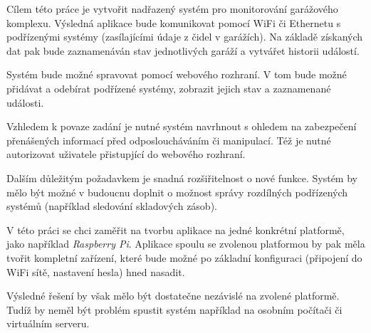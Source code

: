 Cílem této práce je vytvořit nadřazený systém pro monitorování garážového komplexu. Výsledná aplikace bude komunikovat pomocí WiFi či Ethernetu s podřízenými systémy (zasílajícími údaje z čidel v garážích). Na základě získaných dat pak bude zaznamenáván stav jednotlivých garáží a vytvářet historii událostí.

Systém bude možné spravovat pomocí webového rozhraní. V tom bude možné přidávat a odebírat podřízené systémy, zobrazit jejich stav a zaznamenané události.

Vzhledem k povaze zadání je nutné systém navrhnout s ohledem na zabezpečení přenášených informací před odposloucháváním či manipulací. Též je nutné autorizovat uživatele přistupjící do webového rozhraní.

Dalším důležitým požadavkem je snadná rozšiřitelnost o nové funkce. Systém by mělo být možné v budoucnu doplnit o možnost správy rozdílných podřízených systémů (například sledování skladových zásob).

V této práci se chci zaměřit na tvorbu aplikace na jedné konkrétní platformě, jako například \textit{Raspberry Pi}. Aplikace spoulu se zvolenou platformou by pak měla tvořit kompletní zařízení, které bude možné po základní konfiguraci (připojení do WiFi sítě, nastavení hesla) hned nasadit.

Výsledné řešení by však mělo být dostatečne nezávislé na zvolené platformě. Tudíž by neměl být problém spustit systém například na osobním počítači či virtuálním serveru.

